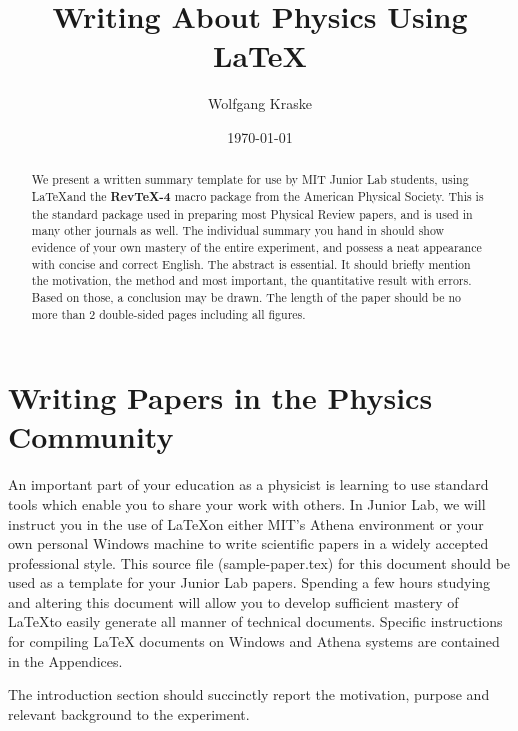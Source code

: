 \title{Writing About Physics Using \LaTeX}
\author         {Wolfgang Kraske}
\date{\today}

\begin{abstract}
We present a written summary template for use by MIT Junior Lab
students, using \LaTeX and the {\bf RevTeX-4} macro package from the
American Physical Society.  This is the standard package used in
preparing most Physical Review papers, and is used in many other
journals as well.  The individual summary you hand in should show
evidence of your own mastery of the entire experiment, and possess a
neat appearance with concise and correct English.  The abstract is
essential.  It should briefly mention the motivation, the method and
most important, the quantitative result with errors.  Based on those,
a conclusion may be drawn.  The length of the paper should be no more
than 2 double-sided pages including all figures.
\end{abstract}

\maketitle


\section{Writing Papers in the Physics Community}

An important part of your education as a physicist is learning to
use standard tools which enable you to share your work with others.
In Junior Lab, we will instruct you in the use of \LaTeX on either
MIT's Athena environment or your own personal Windows machine to
write scientific papers in a widely accepted professional style.
This source file (sample-paper.tex) for this document should be used
as a template for your Junior Lab papers. Spending a few hours
studying and altering this document will allow you to develop
sufficient mastery of \LaTeX to easily generate all manner of
technical documents.  Specific instructions for compiling \LaTeX
documents on Windows and Athena systems are contained in the
Appendices.

The introduction section should succinctly report the motivation,
purpose and relevant background to the experiment.

